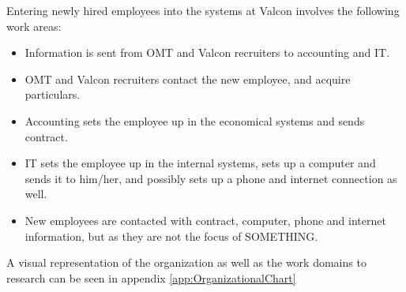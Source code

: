 Entering newly hired employees into the systems at Valcon involves the following work areas:

\begin{itemize}
\item Information is sent from OMT and Valcon recruiters to accounting and IT.
\item OMT and Valcon recruiters contact the new employee, and acquire particulars.
\item Accounting sets the employee up in the economical systems and sends contract.
\item IT sets the employee up in the internal systems, sets up a computer and sends it to him/her, and possibly sets up a phone and internet connection as well.
\item New employees are contacted with contract, computer, phone and internet information, but as they are not the focus of SOMETHING. 
\end{itemize}

A visual representation of the organization as well as the work domains to research can be seen in appendix \ref{app:OrganizationalChart}